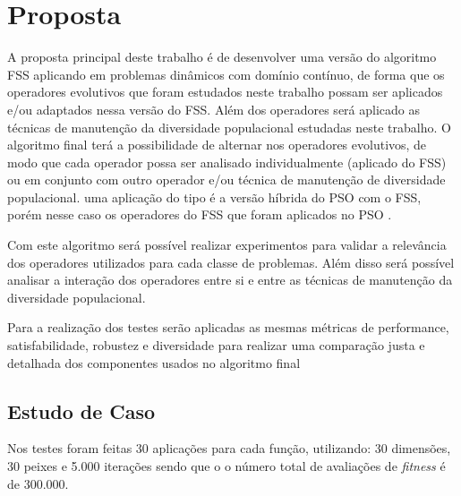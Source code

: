 \chapter{Proposta}
\label{ch:proposta}

A proposta principal deste trabalho é de desenvolver uma versão do algoritmo FSS aplicando em problemas dinâmicos com domínio contínuo, de forma que os operadores evolutivos que foram estudados neste trabalho possam ser aplicados e/ou adaptados nessa versão do FSS. Além dos operadores será aplicado as técnicas de manutenção da diversidade populacional estudadas neste trabalho. O algoritmo final terá a possibilidade de alternar nos operadores evolutivos, de modo que cada operador possa ser analisado individualmente (aplicado do FSS) ou em conjunto com outro operador e/ou técnica de manutenção de diversidade populacional. uma aplicação do tipo é a versão híbrida do PSO com o FSS, porém nesse caso os operadores do FSS que foram aplicados no PSO \cite{cavalcanti2011hybrid}.

Com este algoritmo será possível realizar experimentos para validar a relevância dos operadores utilizados para cada classe de problemas. Além disso será possível analisar a interação dos operadores entre si e entre as técnicas de manutenção da diversidade populacional.

Para a realização dos testes serão aplicadas as mesmas métricas de performance, satisfabilidade, robustez e diversidade para realizar uma comparação justa e detalhada dos componentes usados no algoritmo final

\section{Estudo de Caso}
\label{sec:test_case}

Nos testes foram feitas 30 aplicações para cada função, utilizando: 30 dimensões, 30 peixes e 5.000 iterações sendo que o o número total de avaliações de \textit{fitness} é de 300.000.
